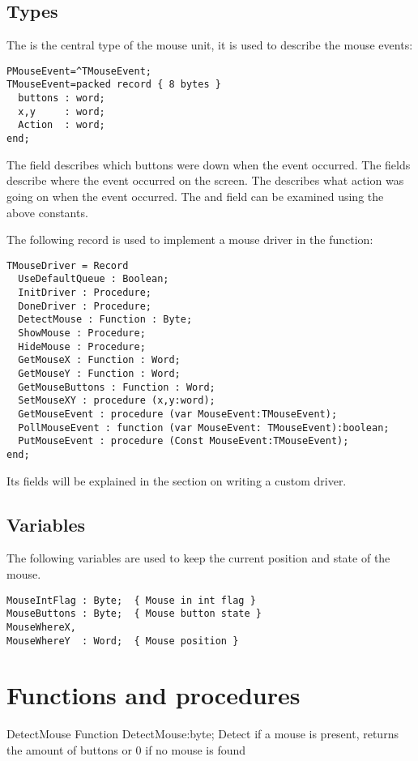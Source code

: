 \subsection{Types}
The  is the central type of the mouse unit, it is used
to describe the mouse events:
\begin{verbatim}
PMouseEvent=^TMouseEvent;
TMouseEvent=packed record { 8 bytes }
  buttons : word;
  x,y     : word;
  Action  : word;
end;
\end{verbatim}
The  field describes which buttons were down when the event
occurred. The  fields describe where the event occurred on the
screen. The  describes what action was going on when the event
occurred. The  and  field can be examined using the
above constants.

The following record is used to implement a mouse driver in the
 function:
\begin{verbatim}
TMouseDriver = Record 
  UseDefaultQueue : Boolean;
  InitDriver : Procedure;
  DoneDriver : Procedure;
  DetectMouse : Function : Byte;
  ShowMouse : Procedure;
  HideMouse : Procedure;
  GetMouseX : Function : Word;
  GetMouseY : Function : Word;
  GetMouseButtons : Function : Word;
  SetMouseXY : procedure (x,y:word);
  GetMouseEvent : procedure (var MouseEvent:TMouseEvent);
  PollMouseEvent : function (var MouseEvent: TMouseEvent):boolean;
  PutMouseEvent : procedure (Const MouseEvent:TMouseEvent); 
end;
\end{verbatim}
Its fields will be explained in the section on writing a custom driver.

\subsection{Variables}
The following variables are used to keep the current position and state of
the mouse.
\begin{verbatim}
MouseIntFlag : Byte;  { Mouse in int flag }
MouseButtons : Byte;  { Mouse button state }
MouseWhereX,
MouseWhereY  : Word;  { Mouse position }
\end{verbatim}

\section{Functions and procedures}

\begin{function}{DetectMouse}
\Declaration
Function DetectMouse:byte;
\Description
 { Detect if a mouse is present, returns the amount of buttons or 0  if no mouse is found }
\Errors
\SeeAlso
\end{function}

